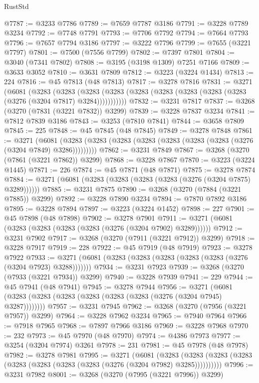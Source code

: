 \begin{lexlean}{RustStd}
\begin{coremodule}
{\begin{coremodule}
{{{{{{{{{{{{{{{{{{{{{{{{{{{{{{{{{{{{{@7787 := @3233 @7786
@7789 := @7659 @7787 @3186
@7791 := @3228 @7789 @3234
@7792 := @7748 @7791
@7793 := @7706 @7792
@7794 := @7664 @7793
@7796 := @7657 @7794 @3186
@7797 := @3222 @7796
@7799 := @7655 (@3221 @7797)
@7801 := @7500 (@7556 @7799)
@7802 := @7397 @7801
@7804 := @3040 (@7341 @7802)
@7808 := @3195 (@3198 @1309) @7251 @7166
@7809 := @3633 @3052
@7810 := @3631 @7809
@7812 := @3223 (@3224 @1434)
@7813 := 224
@7816 := @45 @7813 (@48 @7813)
@7817 := @3278 @7816
@7831 := @3271
    (@6081
      (@3283
        (@3283
          (@3283 (@3283 (@3283 (@3283 (@3283 (@3283 (@3283 (@3276 (@3204 @7817) @3284)))))))))))
@7832 := @3231 @7817
@7837 := @3268 (@3270 (@7831 (@3221 @7832)) @3299)
@7839 := @3228 @7837 @3234
@7841 := @7812 @7839 @3186
@7843 := @3253 (@7810 @7841)
@7844 := @3658 @7809
@7845 := 225
@7848 := @45 @7845 (@48 @7845)
@7849 := @3278 @7848
@7861 := @3271
    (@6081 (@3283 (@3283 (@3283 (@3283 (@3283 (@3283 (@3283 (@3276 (@3204 @7849) @3286)))))))))
@7862 := @3231 @7849
@7867 := @3268 (@3270 (@7861 (@3221 @7862)) @3299)
@7868 := @3228 @7867
@7870 := @3223 (@3224 @1445)
@7871 := 226
@7874 := @45 @7871 (@48 @7871)
@7875 := @3278 @7874
@7884 := @3271 (@6081 (@3283 (@3283 (@3283 (@3283 (@3276 (@3204 @7875) @3289))))))
@7885 := @3231 @7875
@7890 := @3268 (@3270 (@7884 (@3221 @7885)) @3299)
@7892 := @3228 @7890 @3234
@7894 := @7870 @7892 @3186
@7895 := @3228 @7894
@7897 := @3223 (@3224 @1452)
@7898 := 227
@7901 := @45 @7898 (@48 @7898)
@7902 := @3278 @7901
@7911 := @3271 (@6081 (@3283 (@3283 (@3283 (@3283 (@3276 (@3204 @7902) @3289))))))
@7912 := @3231 @7902
@7917 := @3268 (@3270 (@7911 (@3221 @7912)) @3299)
@7918 := @3228 @7917
@7919 := 228
@7922 := @45 @7919 (@48 @7919)
@7923 := @3278 @7922
@7933 := @3271 (@6081 (@3283 (@3283 (@3283 (@3283 (@3283 (@3276 (@3204 @7923) @3288)))))))
@7934 := @3231 @7923
@7939 := @3268 (@3270 (@7933 (@3221 @7934)) @3299)
@7940 := @3228 @7939
@7941 := 229
@7944 := @45 @7941 (@48 @7941)
@7945 := @3278 @7944
@7956 := @3271 (@6081 (@3283 (@3283 (@3283 (@3283 (@3283 (@3283 (@3276 (@3204 @7945) @3287))))))))
@7957 := @3231 @7945
@7962 := @3268 (@3270 (@7956 (@3221 @7957)) @3299)
@7964 := @3228 @7962 @3234
@7965 := @7940 @7964
@7966 := @7918 @7965
@7968 := @7897 @7966 @3186
@7969 := @3228 @7968
@7970 := 232
@7973 := @45 @7970 (@48 @7970)
@7974 := @4386 @7973
@7977 := @3254 (@3204 @7974) @3261
@7978 := 231
@7981 := @45 @7978 (@48 @7978)
@7982 := @3278 @7981
@7995 := @3271
    (@6081
      (@3283 (@3283 (@3283 (@3283 (@3283 (@3283 (@3283 (@3283 (@3276 (@3204 @7982) @3285))))))))))
@7996 := @3231 @7982
@8001 := @3268 (@3270 (@7995 (@3221 @7996)) @3299)
}}}}}}}}}}}}}}}}}}}}}}}}}}}}}}}}}}}}}
\end{coremodule}}
\end{coremodule}
\end{lexlean}

